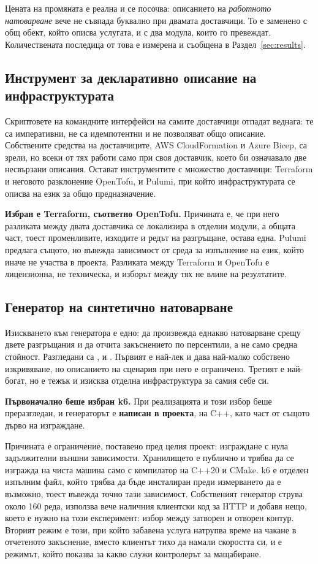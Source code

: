 Цената на промяната е реална и се посочва: описанието на \emph{работното натоварване}
вече не съвпада буквално при двамата доставчици. То е заменено с общ обект, който описва
услугата, и с два модула, които го превеждат. Количествената последица от това е
измерена и съобщена в Раздел~\ref{sec:results}.

\subsection{Инструмент за декларативно описание на инфраструктурата}

Скриптовете на командните интерфейси на самите доставчици отпадат веднага: те са
императивни, не са идемпотентни и не позволяват общо описание. Собствените средства
на доставчиците, AWS CloudFormation и Azure Bicep, са зрели, но всеки от тях работи
само при своя доставчик, което би означавало две несвързани описания. Остават
инструментите с множество доставчици: Terraform и неговото разклонение OpenTofu, и
Pulumi, при който инфраструктурата се описва на език за общо предназначение.

\textbf{Избран е Terraform, съответно OpenTofu.} Причината е, че при него разликата
между двата доставчика се локализира в отделни модули, а общата част, тоест
променливите, изходите и редът на разгръщане, остава една. Pulumi предлага същото, но
въвежда зависимост от среда за изпълнение на език, който иначе не участва в проекта.
Разликата между Terraform и OpenTofu е лицензионна, не техническа, и изборът между тях
не влияе на резултатите.

\subsection{Генератор на синтетично натоварване}

Изискването към генератора е едно: да произвежда еднакво натоварване срещу двете
разгръщания и да отчита закъснението по персентили, а не само средна стойност.
Разгледани са ,  и . Първият е най-лек и дава
най-малко собствено изкривяване, но описанието на сценария при него е ограничено.
Третият е най-богат, но е тежък и изисква отделна инфраструктура за самия себе си.

\textbf{Първоначално беше избран k6.} При реализацията и този избор беше преразгледан, и
генераторът е \textbf{написан в проекта}, на C++, като част от същото дърво на изграждане.

Причината е ограничение, поставено пред целия проект: изграждане с нула задължителни
външни зависимости. Хранилището е публично и трябва да се изгражда на чиста машина само с
компилатор на C++20 и CMake. k6 е отделен изпълним файл, който трябва да бъде инсталиран
преди измерването да е възможно, тоест въвежда точно тази зависимост. Собственият
генератор струва около 160 реда, използва вече наличния клиентски код за HTTP и добавя
нещо, което е нужно на този експеримент: избор между затворен и отворен контур. Вторият
режим е този, при който забавена услуга натрупва време на чакане в отчетеното закъснение,
вместо клиентът тихо да намали скоростта си, и е режимът, който показва за какво служи
контролерът за мащабиране.

